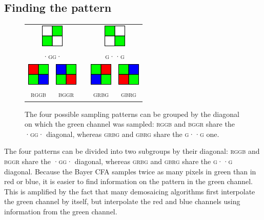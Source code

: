 \documentclass{ipol}
\begin{document}
\subsection{Finding the pattern}
\begin{figure}[h]
        \centering
        \begin{tabular}{ccccc}
                \multicolumn{2}{c}{\includegraphics[width=30pt]{images/xggx.png}}&&\multicolumn{2}{c}{\includegraphics[width=30pt]{images/gxxg.png}}\\
                \multicolumn{2}{c}{\textsc{·gg·}} && \multicolumn{2}{c}{\textsc{g··g}}\\
                \includegraphics[width=30pt]{images/rggb.png}&
                \includegraphics[width=30pt]{images/bggr.png}&
                \qquad\qquad& %
                \includegraphics[width=30pt]{images/grbg.png}&
                \includegraphics[width=30pt]{images/gbrg.png}\\
                \textsc{rggb} & \textsc{bggr} && \textsc{grbg} & \textsc{gbrg}\\
        \end{tabular}
        \label{fig:fourpatterns}
        \caption{The four possible sampling patterns can be grouped by the diagonal on which the green channel was sampled: \textsc{rggb} and \textsc{bggr} share the \textsc{·gg·} diagonal, whereas \textsc{grbg} and \textsc{gbrg} share the \textsc{g··g} one.}
\end{figure}
The four patterns can be divided into two subgroups by their diagonal: \textsc{rggb} and \textsc{bggr} share the \textsc{·gg·} diagonal, whereas \textsc{grbg} and \textsc{gbrg} share the \textsc{g··g} diagonal. Because the Bayer CFA samples twice as many pixels in green than in red or blue, it is easier to find information on the pattern in the green channel. This is amplified by the fact that many demosaicing algorithms first interpolate the green channel by itself, but interpolate the red and blue channels using information from the green channel.
\end{document}
